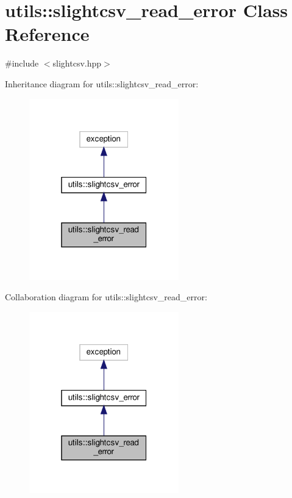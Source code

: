 \hypertarget{classutils_1_1slightcsv__read__error}{}\section{utils\+:\+:slightcsv\+\_\+read\+\_\+error Class Reference}
\label{classutils_1_1slightcsv__read__error}


{\ttfamily \#include $<$slightcsv.\+hpp$>$}



Inheritance diagram for utils\+:\+:slightcsv\+\_\+read\+\_\+error\+:\nopagebreak
\begin{figure}[H]
\begin{center}
\leavevmode
\includegraphics[width=184pt]{classutils_1_1slightcsv__read__error__inherit__graph}
\end{center}
\end{figure}


Collaboration diagram for utils\+:\+:slightcsv\+\_\+read\+\_\+error\+:\nopagebreak
\begin{figure}[H]
\begin{center}
\leavevmode
\includegraphics[width=184pt]{classutils_1_1slightcsv__read__error__coll__graph}
\end{center}
\end{figure}


